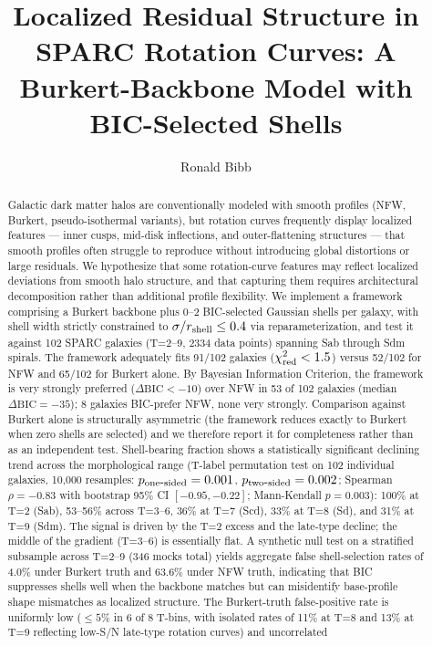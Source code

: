 
\title{Localized Residual Structure in SPARC Rotation Curves: A Burkert-Backbone Model with BIC-Selected Shells}

\author[orcid=0009-0004-1153-2464]{Ronald Bibb}

\begin{abstract}
Galactic dark matter halos are conventionally modeled with smooth profiles (NFW, Burkert, pseudo-isothermal variants), but rotation curves frequently display localized features --- inner cusps, mid-disk inflections, and outer-flattening structures --- that smooth profiles often struggle to reproduce without introducing global distortions or large residuals. We hypothesize that some rotation-curve features may reflect localized deviations from smooth halo structure, and that capturing them requires architectural decomposition rather than additional profile flexibility. We implement a framework comprising a Burkert backbone plus 0--2 BIC-selected Gaussian shells per galaxy, with shell width strictly constrained to $\sigma/r_{\rm shell} \leq 0.4$ via reparameterization, and test it against 102 SPARC galaxies (T=2--9, 2334 data points) spanning Sab through Sdm spirals. The framework adequately fits 91/102 galaxies ($\chi^2_{\rm red} < 1.5$) versus 52/102 for NFW and 65/102 for Burkert alone. By Bayesian Information Criterion, the framework is very strongly preferred ($\Delta\mathrm{BIC} < -10$) over NFW in 53 of 102 galaxies (median $\Delta\mathrm{BIC} = -35$); 8 galaxies BIC-prefer NFW, none very strongly. Comparison against Burkert alone is structurally asymmetric (the framework reduces exactly to Burkert when zero shells are selected) and we therefore report it for completeness rather than as an independent test. Shell-bearing fraction shows a statistically significant declining trend across the morphological range (T-label permutation test on 102 individual galaxies, 10{,}000 resamples: $p_{\rm one\mbox{-}sided} = 0.001$, $p_{\rm two\mbox{-}sided} = 0.002$; Spearman $\rho = -0.83$ with bootstrap 95\% CI $[-0.95, -0.22]$; Mann-Kendall $p = 0.003$): 100\% at T=2 (Sab), 53--56\% across T=3--6, 36\% at T=7 (Scd), 33\% at T=8 (Sd), and 31\% at T=9 (Sdm). The signal is driven by the T=2 excess and the late-type decline; the middle of the gradient (T=3--6) is essentially flat. A synthetic null test on a stratified subsample across T=2--9 (346 mocks total) yields aggregate false shell-selection rates of 4.0\% under Burkert truth and 63.6\% under NFW truth, indicating that BIC suppresses shells well when the backbone matches but can misidentify base-profile shape mismatches as localized structure. The Burkert-truth false-positive rate is uniformly low ($\leq 5\%$ in 6 of 8 T-bins, with isolated rates of 11\% at T=8 and 13\% at T=9 reflecting low-S/N late-type rotation curves) and uncorrelated 
\end{abstract}
